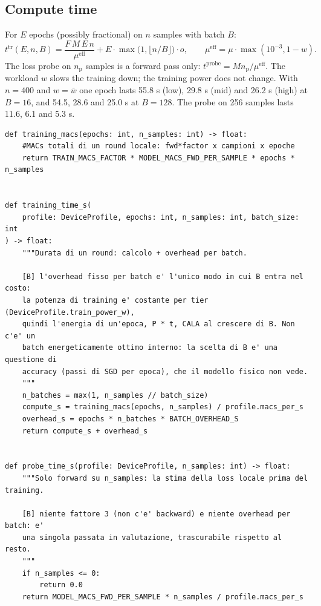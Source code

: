 \documentclass[11pt,a4paper]{article}
\begin{document}
\subsection{Compute time}

For $E$ epochs (possibly fractional) on $n$ samples with batch $B$:
\begin{equation}
  t^{\mathrm{tr}}(E, n, B) = \frac{F \, M \, E \, n}{\mu^{\mathrm{eff}}}
                           + E \cdot \max\!\bigl(1, \lfloor n / B \rfloor\bigr) \cdot o ,
  \qquad
  \mu^{\mathrm{eff}} = \mu \cdot \max(10^{-3}, 1 - w) .
  \label{eq:ttrain}
\end{equation}
The loss probe on $n_{\mathrm{p}}$ samples is a forward pass only:
$t^{\mathrm{probe}} = M n_{\mathrm{p}} / \mu^{\mathrm{eff}}$. The workload $w$
slows the training down; the training power does not change. With $n = 400$
and $w = \bar{w}$ one epoch lasts 55.8 s (low), 29.8 s (mid) and 26.2 s
(high) at $B = 16$, and 54.5, 28.6 and 25.0 s at $B = 128$. The probe on 256
samples lasts 11.6, 6.1 and 5.3 s.

\begin{lstlisting}[style=py,firstnumber=11,caption={\texttt{tesifl/device/compute\_model.py}, lines 11--41}]
def training_macs(epochs: int, n_samples: int) -> float:
    #MACs totali di un round locale: fwd*factor x campioni x epoche
    return TRAIN_MACS_FACTOR * MODEL_MACS_FWD_PER_SAMPLE * epochs * n_samples


def training_time_s(
    profile: DeviceProfile, epochs: int, n_samples: int, batch_size: int
) -> float:
    """Durata di un round: calcolo + overhead per batch.

    [B] l'overhead fisso per batch e' l'unico modo in cui B entra nel costo:
    la potenza di training e' costante per tier (DeviceProfile.train_power_w),
    quindi l'energia di un'epoca, P * t, CALA al crescere di B. Non c'e' un
    batch energeticamente ottimo interno: la scelta di B e' una questione di
    accuracy (passi di SGD per epoca), che il modello fisico non vede.
    """
    n_batches = max(1, n_samples // batch_size)
    compute_s = training_macs(epochs, n_samples) / profile.macs_per_s
    overhead_s = epochs * n_batches * BATCH_OVERHEAD_S
    return compute_s + overhead_s


def probe_time_s(profile: DeviceProfile, n_samples: int) -> float:
    """Solo forward su n_samples: la stima della loss locale prima del training.

    [B] niente fattore 3 (non c'e' backward) e niente overhead per batch: e'
    una singola passata in valutazione, trascurabile rispetto al resto.
    """
    if n_samples <= 0:
        return 0.0
    return MODEL_MACS_FWD_PER_SAMPLE * n_samples / profile.macs_per_s
\end{lstlisting}
\end{document}
